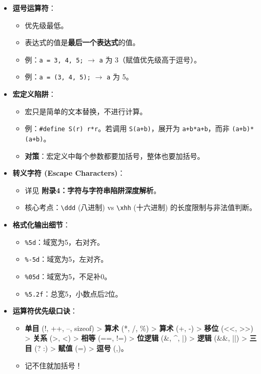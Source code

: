 \documentclass[a4paper,12pt]{article}
\begin{document}
\begin{itemize}
    \item \textbf{逗号运算符}：
    \begin{itemize}
        \item 优先级最低。
        \item 表达式的值是\textbf{最后一个表达式}的值。
        \item 例：\texttt{a = 3, 4, 5;} $\rightarrow$ \texttt{a} 为 3（赋值优先级高于逗号）。
        \item 例：\texttt{a = (3, 4, 5);} $\rightarrow$ \texttt{a} 为 5。
    \end{itemize}

    \item \textbf{宏定义陷阱}：
    \begin{itemize}
        \item 宏只是简单的文本替换，不进行计算。
        \item 例：\texttt{\#define S(r) r*r}。若调用 \texttt{S(a+b)}，展开为 \texttt{a+b*a+b}，而非 \texttt{(a+b)*(a+b)}。
        \item \textbf{对策}：宏定义中每个参数都要加括号，整体也要加括号。
    \end{itemize}

    \item \textbf{转义字符 (Escape Characters)}：
    \begin{itemize}
        \item 详见 \textbf{附录4：字符与字符串陷阱深度解析}。
        \item 核心考点：\texttt{\textbackslash ddd} (八进制) vs \texttt{\textbackslash xhh} (十六进制) 的长度限制与非法值判断。
    \end{itemize}

    \item \textbf{格式化输出细节}：
    \begin{itemize}
        \item \texttt{\%5d}：域宽为5，右对齐。
        \item \texttt{\%-5d}：域宽为5，左对齐。
        \item \texttt{\%05d}：域宽为5，不足补0。
        \item \texttt{\%5.2f}：总宽5，小数点后2位。
    \end{itemize}

    \item \textbf{运算符优先级口诀}：
    \begin{itemize}
        \item \textbf{单目} (!, ++, --, sizeof) > \textbf{算术} (*, /, \%) > \textbf{算术} (+, -) > \textbf{移位} (<<, >>) > \textbf{关系} (>, <) > \textbf{相等} (==, !=) > \textbf{位逻辑} (\&, \^{}, |) > \textbf{逻辑} (\&\&, ||) > \textbf{三目} (? :) > \textbf{赋值} (=) > \textbf{逗号} (,)。
        \item 记不住就加括号！
    \end{itemize}
    

\end{itemize}
\end{document}

